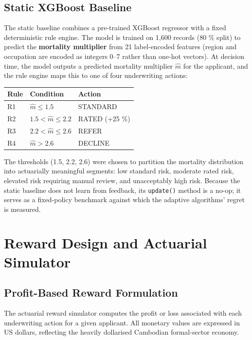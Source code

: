 \subsection{Static XGBoost Baseline}\label{static-xgboost-baseline}

The static baseline combines a pre-trained XGBoost regressor with a fixed deterministic rule engine. The model is trained on 1,600 records (80 \% split) to predict the \textbf{mortality multiplier} from 21 label-encoded features (region and occupation are encoded as integers 0--7 rather than one-hot vectors). At decision time, the model outputs a predicted mortality multiplier \(\hat{m}\) for the applicant, and the rule engine maps this to one of four underwriting actions:

{\def\LTcaptype{none} %
\begin{longtable}[]{@{}lll@{}}
\toprule\noalign{}
Rule & Condition & Action \\
\midrule\noalign{}
\endhead
\bottomrule\noalign{}
\endlastfoot
R1 & \(\hat{m} \le 1.5\) & STANDARD \\
R2 & \(1.5 < \hat{m} \le 2.2\) & RATED (+25 \%) \\
R3 & \(2.2 < \hat{m} \le 2.6\) & REFER \\
R4 & \(\hat{m} > 2.6\) & DECLINE \\
\end{longtable}
}

The thresholds (1.5, 2.2, 2.6) were chosen to partition the mortality distribution into actuarially meaningful segments: low standard risk, moderate rated risk, elevated risk requiring manual review, and unacceptably high risk. Because the static baseline does not learn from feedback, its \texttt{update()} method is a no-op; it serves as a fixed-policy benchmark against which the adaptive algorithms' regret is measured.

\section{Reward Design and Actuarial Simulator}\label{reward-design-and-actuarial-simulator}

\subsection{Profit-Based Reward Formulation}\label{profit-based-reward-formulation}

The actuarial reward simulator computes the profit or loss associated with each underwriting action for a given applicant. All monetary values are expressed in US dollars, reflecting the heavily dollarised Cambodian formal-sector economy.

